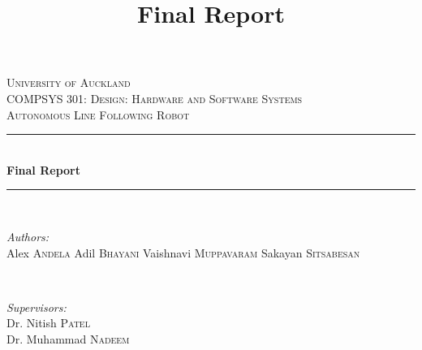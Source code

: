 \documentclass{article}
\title{Final Report}
\begin{document}
\begin{titlepage}

\newcommand{\HRule}{\rule{\linewidth}{0.5mm}}

\center
 

\textsc{\LARGE University of Auckland}\\[1.5cm]
\textsc{\Large COMPSYS 301: Design: Hardware and Software Systems }\\[0.5cm]
\textsc{\large Autonomous Line Following Robot}\\[0.5cm]


\HRule \\[0.4cm]
{ \huge \bfseries Final Report}\\[0.4cm]
\HRule \\[1.5cm]
 

\begin{minipage}{0.4\textwidth}
\begin{flushleft} \large
\emph{Authors:}\\
Alex \textsc{Andela} \newline
Adil \textsc{Bhayani} \newline
Vaishnavi \textsc{Muppavaram} \newline
Sakayan \textsc{Sitsabesan}
\end{flushleft}
\end{minipage}
~
\begin{minipage}{0.4\textwidth}
\begin{flushright} \large
\emph{Supervisors:} \\
Dr. Nitish \textsc{Patel} \\
Dr. Muhammad \textsc{Nadeem} %
\end{flushright}
\end{minipage}\\[1cm]


\end{titlepage}
\end{document}
